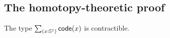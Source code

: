 \documentclass[hott-all.tex]{subfiles}
\begin{document}
\subsection{The homotopy-theoretic proof}
% 
% 
% 
\begin{lem}
  The type $\sm{x:\Sn^1}\code(x)$ is contractible.
\end{lem}
% 
\end{document}

